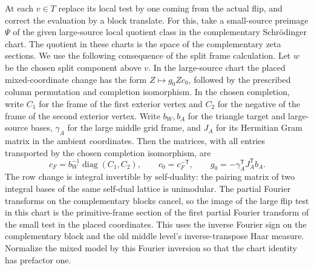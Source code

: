 At each \(v\in T\) replace its local test by one coming from
the actual flip, and correct the evaluation by a block translate.
For this, take a small-source preimage \(\Psi\) of the given
large-source local quotient class in the complementary
Schr\"odinger chart. The quotient in these charts is the
space of the complementary zeta sections. We use the
following consequence of the split frame calculation.
Let \(w\) be the chosen split component above \(v\).
In the large-source chart the placed mixed-coordinate
change has the form \(Z\mapsto g_0Zc_0\), followed by
the prescribed column permutation and completion
isomorphism. In the chosen completion, write \(C_1\)
for the frame of the first exterior vertex and \(C_2\)
for the negative of the frame of the second exterior
vertex. Write \(b_W,b_A\) for the triangle target and
large-source bases, \(\gamma_A\) for the large middle
grid frame, and \(J_A\) for its Hermitian Gram matrix
in the ambient coordinates. Then the matrices, with
all entries transported by the chosen completion
isomorphism, are
\[
 c_F=b_W^{-1}\operatorname{diag}(C_1,C_2),\qquad
 c_0=c_F^{-\mathsf T},\qquad
 g_0=-\gamma_A^{\mathsf T}J_A^{\mathsf T}b_A.
\]
The row change is integral invertible by self-duality:
the pairing matrix of two integral bases of the
same self-dual lattice is unimodular.
The partial Fourier transforms on the
complementary blocks cancel, so the image of the large
flip test in this chart is the primitive-frame section
of the first partial Fourier transform of the small
test in the placed coordinates.
This uses the inverse Fourier sign on the complementary
block and the old middle level's inverse-transpose Haar
measure. Normalize the mixed model by this Fourier
inversion so that the chart identity has prefactor one.

